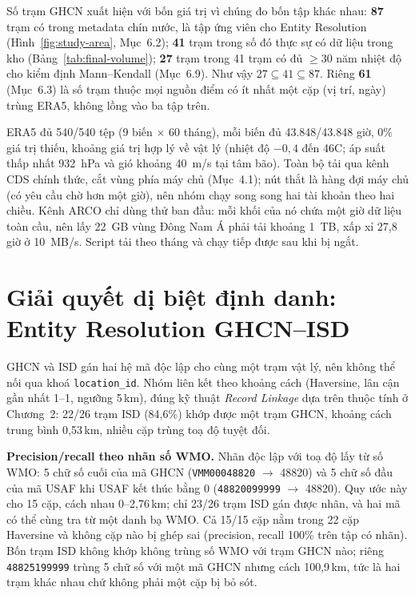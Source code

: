 \documentclass[12pt,a4paper]{report}
\begin{document}
Số trạm GHCN xuất hiện với bốn giá trị vì chúng đo bốn tập khác nhau: \textbf{87} trạm có trong
metadata chín nước, là tập ứng viên cho Entity Resolution (Hình~\ref{fig:study-area}, Mục~6.2);
\textbf{41} trạm trong số đó thực sự có dữ liệu trong kho (Bảng~\ref{tab:final-volume}); \textbf{27}
trạm trong 41 trạm có đủ $\geq 30$ năm nhiệt độ cho kiểm định Mann--Kendall (Mục~6.9). Như vậy
$27 \subseteq 41 \subseteq 87$. Riêng \textbf{61} (Mục~6.3) là số trạm thuộc mọi nguồn điểm có ít
nhất một cặp (vị trí, ngày) trùng ERA5, không lồng vào ba tập trên.

ERA5 đủ 540/540 tệp (9 biến $\times$ 60 tháng), mỗi biến đủ 43.848/43.848 giờ, 0\% giá trị thiếu,
khoảng giá trị hợp lý về vật lý (nhiệt độ $-0{,}4$ đến 46\textdegree{}C; áp suất thấp nhất 932~hPa và
gió khoảng 40~m/s tại tâm bão). Toàn bộ tải qua kênh CDS chính thức, cắt vùng phía máy chủ (Mục~4.1);
nút thắt là hàng đợi máy chủ (có yêu cầu chờ hơn một giờ), nên nhóm chạy song song hai tài khoản theo
hai chiều. Kênh ARCO chỉ dùng thử ban đầu: mỗi khối của nó chứa một giờ dữ liệu toàn cầu, nên lấy 22~GB
vùng Đông Nam Á phải tải khoảng 1~TB, xấp xỉ 27,8 giờ ở 10~MB/s. Script tải theo tháng và chạy tiếp
được sau khi bị ngắt.

\section{Giải quyết dị biệt định danh: Entity Resolution GHCN--ISD}

GHCN và ISD gán hai hệ mã độc lập cho cùng một trạm vật lý, nên không thể nối qua khoá
\texttt{location\_id}. Nhóm liên kết theo khoảng cách (Haversine, lân cận gần nhất 1--1, ngưỡng
5\,km), đúng kỹ thuật \textit{Record Linkage} dựa trên thuộc tính ở Chương~2: 22/26 trạm ISD
(84,6\%) khớp được một trạm GHCN, khoảng cách trung bình 0,53\,km, nhiều cặp trùng toạ độ tuyệt đối.

\textbf{Precision/recall theo nhãn số WMO.} Nhãn độc lập với toạ độ lấy từ số WMO: 5 chữ số cuối
của mã GHCN (\texttt{VMM00048820} $\to$ 48820) và 5 chữ số đầu của mã USAF khi USAF kết thúc bằng 0
(\texttt{48820099999} $\to$ 48820). Quy ước này cho 15 cặp, cách nhau 0--2,76\,km; chỉ 23/26 trạm ISD
gán được nhãn, và hai mã có thể cùng tra từ một danh bạ WMO. Cả 15/15 cặp nằm trong 22 cặp Haversine
và không cặp nào bị ghép sai (precision, recall 100\% trên tập có nhãn). Bốn trạm ISD không khớp
không trùng số WMO với trạm GHCN nào; riêng \texttt{48825199999} trùng 5 chữ số với một mã GHCN nhưng
cách 100,9\,km, tức là hai trạm khác nhau chứ không phải một cặp bị bỏ sót.
\end{document}
